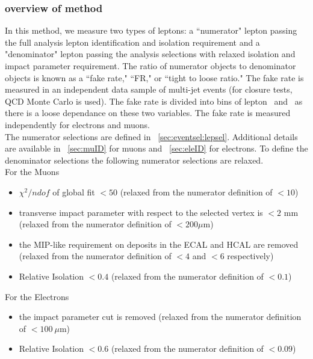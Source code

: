        		\subsubsection{overview of method}
		In this method, we measure two types of leptons: a ``numerator" lepton passing the full analysis lepton identification and isolation requirement  and a "denominator" lepton passing the analysis selections with relaxed isolation and impact parameter requirement. The ratio of numerator objects to denominator objects is known as a ``fake rate," ``FR," or ``tight to loose ratio."  The fake rate is measured in an independent data sample of multi-jet events (for closure tests, QCD Monte Carlo is used). The fake rate is divided into bins of lepton \pt \ and \aeta \ as there is a loose dependance on these two variables. The fake rate is measured independently for electrons and muons.\\

The numerator selections are defined in ~\ref{sec:eventsel:lepsel}. Additional details are available in ~\ref{sec:muID} for muons and ~\ref{sec:eleID} for electrons. To define the denominator selections the following numerator selections are relaxed.\\
For the Muons
\begin{itemize}
\item $\chi ^{2}/ndof$ of global fit $\lt 50$ (relaxed from the numerator definition of $\lt 10$)\\
\item transverse impact parameter with respect to the selected vertex is $\lt 2$ mm (relaxed from the numerator definition of $\lt 200 \mu$m)\\
\item the MIP-like requirement on deposits in the ECAL and HCAL are removed (relaxed from the numerator definition of $\lt 4$ and $\lt 6$ \GeV respectively)\\
\item Relative Isolation $\lt 0.4$ (relaxed from the numerator definition of $\lt 0.1$)\\
\end{itemize}
For the Electrons
\begin{itemize}
\item the impact parameter cut is removed (relaxed from the numerator definition of $\lt 100 \ \mu$m)\\
\item Relative Isolation $\lt 0.6$ (relaxed from the numerator definition of $\lt 0.09$)\\
\end{itemize}

